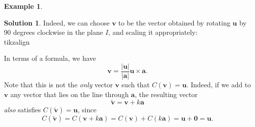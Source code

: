 \documentclass[a4paper,11pt]{book}
\theoremstyle{definition}
\newtheorem{example_environment}{Example}[chapter]
\newtheorem*{solution}{Solution}
\newcommand{\ve}[1]{\mathbf{#1}}
\newenvironment{example}
	{
		\begin{oframed} 
		\begin{example_environment}
	}
	{
		\end{example_environment}
		\end{oframed}
	}
\begin{document}
\begin{example}
\begin{solution}
Indeed, we can choose $\ve{v}$ to be the vector obtained by rotating $\ve{u}$ by 90 degrees clockwise in the plane $I$, and scaling it appropriately:\\
tikzalign
\begin{center}
\end{center}


In terms of a formula, we have
\[
 \ve{v} = \frac{|\ve{u}|}{|\ve{a}|} \ve{u} \times \ve{a} .
\]
Note that this is not the {\em only} vector $\ve{v}$ such that $C(\ve{v}) = \ve{u}$. Indeed, if we add to $\ve{v}$ any vector that lies on the line through $\ve{a}$, the resulting vector
\[
  \tilde{\ve{v}} = \ve{v} + k \ve{a}
\]
{\em also} satisfies $C(\tilde{\ve{v}}) = \ve{u}$, since
\[
 C(\tilde{\ve{v}}) = C(\ve{v} + k \ve{a}) = C(\ve{v}) + C(k \ve{a}) = \ve{u} + \ve{0} = \ve{u}.
\]
\end{solution}
\end{example}
\end{document}
